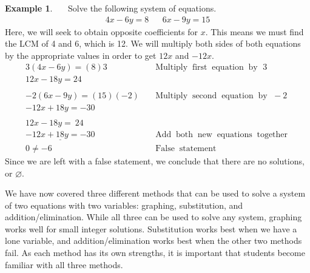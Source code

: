 \documentclass[12pt]{book}
\theoremstyle{definition}
\newtheorem{example}{Example}
\newcommand{\tmop}[1]{\ensuremath{\operatorname{#1}}}
\begin{document}
\begin{example}~~~Solve the following system of equations.
   \begin{eqnarray*}
			4 x - 6 y = 8 & & 6 x - 9 y = 15
	 \end{eqnarray*}
Here, we will seek to obtain opposite coefficients for $x$.  This means we must find the LCM of 4 and 6, which is 12.  We will multiply both sides of both equations by the appropriate values in order to get $12x$ and $-12x$. 
\begin{eqnarray*}
    3 (4 x - 6 y) = (8) 3 &  & \tmop{Multiply} \tmop{first} \tmop{equation}
    \tmop{by~} 3\\
    12 x - 18 y = 24~~~ &  & \\
    &  & \\
    - 2 (6 x - 9 y) = (15) (- 2) &  & \tmop{Multiply} \tmop{second}
    \tmop{equation} \tmop{by~} - 2\\
    - 12 x + 18 y = - 30~~~~~~ &  & \\
    &  & \\
    12 x - 18 y = ~24~ &  &\\
    \underline{- 12 x + 18 y = - 30} &  &  \tmop{Add} \tmop{both} \tmop{new} \tmop{equations}
    \tmop{together}\\
    0 \neq - 6~~ &  & \tmop{False} \tmop{statement}
  \end{eqnarray*}
Since we are left with a false statement, we conclude that there are no solutions, or $\varnothing$.
\end{example}
We have now covered three different methods that can be used to solve a system of two equations with two variables: graphing, substitution, and addition/elimination. While all three can be used to solve any system, graphing works well for small integer solutions. Substitution works best when we have a lone variable, and addition/elimination works best when the other two methods fail. As each method has its own strengths, it is important that students become familiar with all three methods.
\end{document}
